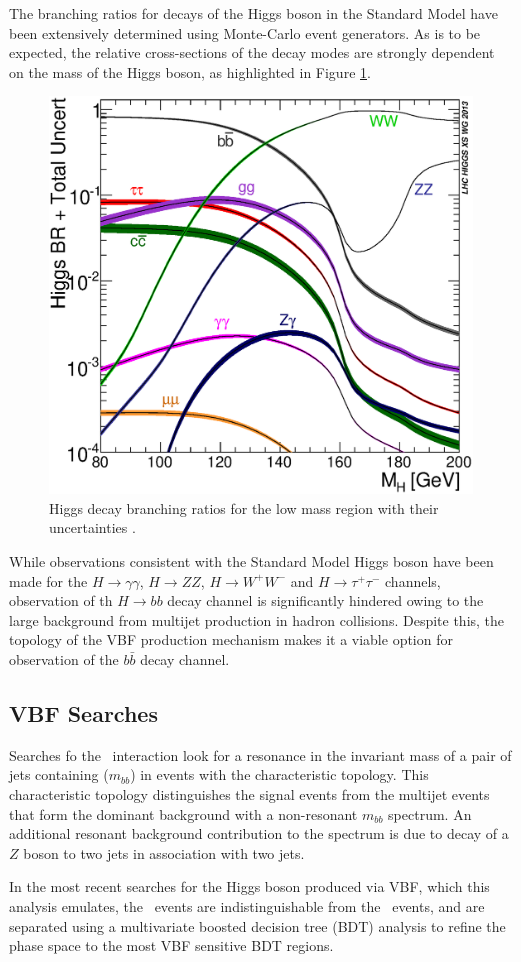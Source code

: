 		The branching ratios for decays of the Higgs boson in the Standard Model have been extensively determined using Monte-Carlo event generators. As is to be expected, the relative cross-sections of the decay modes are strongly dependent on the mass of the Higgs boson, as highlighted in Figure \ref{fig:higgsbrlm}.

		\begin{figure}[h]
			\centering
			\includegraphics[width=0.5\linewidth]{T/FIGS/Higgs_BR_LM}
			\caption{Higgs decay branching ratios for the low mass region with their uncertainties \cite{LHCHiggsXS2013}.}
			\label{fig:higgsbrlm}
		\end{figure}

		\newpage
		While observations consistent with the Standard Model Higgs boson have been made for the $H\rightarrow \gamma\gamma$, $H\rightarrow ZZ$, $H\rightarrow W^+W^-$ and $H\rightarrow \tau^+\tau^-$ channels, observation of th $H\rightarrow bb$ decay channel is significantly hindered owing to the large background from multijet production in hadron collisions. Despite this, the topology of the VBF production mechanism makes it a viable option for observation of the  $b\bar{b}$ decay channel.

	\subsection{VBF Searches}

		Searches fo the \VBFHBB\, interaction look for a resonance in the invariant mass of a pair of jets containing \bquarks ($m_{bb}$) in events with the characteristic topology. This characteristic topology distinguishes the signal events from the multijet events that form the dominant background with a non-resonant $m_{bb}$ spectrum. An additional resonant background contribution to the \mbb spectrum is due to decay of a $Z$ boson to two jets in association with two jets.

		In the most recent searches for the Higgs boson produced via VBF, which this analysis emulates, the \VBFHBB\, events are indistinguishable from the \ggF\, events, and are separated using a multivariate boosted decision tree (BDT) analysis to refine the phase space to the most VBF sensitive BDT regions.


\endinput
